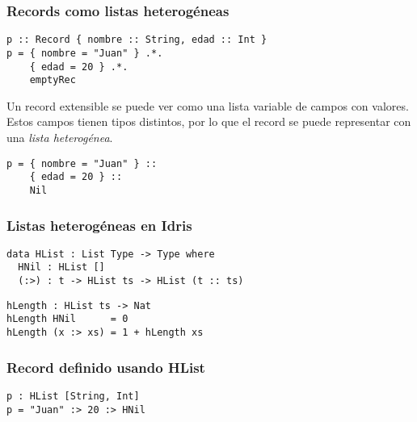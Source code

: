 \documentclass{beamer}
\begin{document}
\begin{frame}[fragile]
\frametitle{Records como listas heterogéneas}

\begin{example}
\begin{verbatim}
p :: Record { nombre :: String, edad :: Int }
p = { nombre = "Juan" } .*.
    { edad = 20 } .*.
    emptyRec
\end{verbatim}
\end{example}

\pause

Un record extensible se puede ver como una lista variable de campos con valores. Estos campos tienen tipos distintos, por lo que el record se puede representar con una \textit{lista heterogénea}. 

\pause

\begin{example}
\begin{verbatim}
p = { nombre = "Juan" } ::
    { edad = 20 } ::
    Nil
\end{verbatim}
\end{example}

\end{frame}

\begin{frame}[fragile]
\frametitle{Listas heterogéneas en Idris}

\begin{definition}
\begin{verbatim}
data HList : List Type -> Type where
  HNil : HList []
  (:>) : t -> HList ts -> HList (t :: ts)
\end{verbatim}
\end{definition}

\pause

\begin{definition}
\begin{verbatim}
hLength : HList ts -> Nat
hLength HNil      = 0
hLength (x :> xs) = 1 + hLength xs
\end{verbatim}
\end{definition}

\end{frame}

\begin{frame}[fragile]
\frametitle{Record definido usando HList}

\begin{example}
\begin{verbatim}
p : HList [String, Int]
p = "Juan" :> 20 :> HNil
\end{verbatim}
\end{example}

\end{frame}
\end{document}
